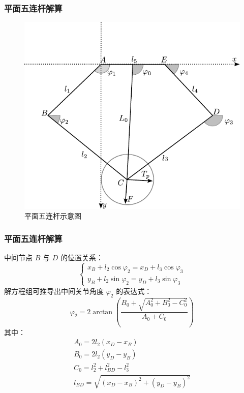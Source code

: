 \documentclass{beamer}
\begin{document}
	\begin{frame}
	\frametitle{平面五连杆解算}
		\begin{figure}          
		\centering              
		\includegraphics[width=0.6\linewidth]{img/chapter3/2}  
		\captionsetup{font=scriptsize} 
		\caption{平面五连杆示意图} 
		
		\end{figure}  
	\end{frame}
	
	\begin{frame}
		\frametitle{平面五连杆解算}
		中间节点 $B$ 与 $D$ 的位置关系：
		\begin{equation*}
			\begin{cases}
				x_B + l_2 \cos\varphi_2 = x_D + l_3 \cos\varphi_3 \\
				y_B + l_2 \sin\varphi_2 = y_D + l_3 \sin\varphi_3
				\tag{3-14}
			\end{cases}
		\end{equation*}
		解方程组可推导出中间关节角度 $\varphi_2$ 的表达式：
		\begin{equation*}
			\varphi_2 = 2\arctan{\left(\frac{B_0 + \sqrt{A_0^2 + B_0^2 - C_0^2}}{A_0 + C_0}\right)}
		\end{equation*}
		其中：
		\begin{gather*}
			A_0 = 2l_2(x_D - x_B) \\
			B_0 = 2l_2(y_D - y_B) \\
			C_0= l_2^2 + l_{BD}^2 - l_3^2 \\
			l_{BD} = \sqrt{(x_D - x_B)^2 + (y_D - y_B)^2}
		\end{gather*}
		
	\end{frame}
	
\end{document}

